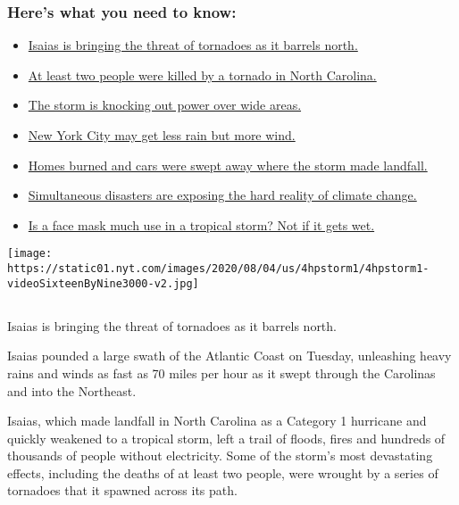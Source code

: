 \hypertarget{heres-what-you-need-to-know}{%
\subsubsection{Here's what you need to
know:}\label{heres-what-you-need-to-know}}

\begin{itemize}
\tightlist
\item
  \protect\hyperlink{link-362830dd}{Isaias is bringing the threat of
  tornadoes as it barrels north.}
\item
  \protect\hyperlink{link-7961bdbc}{At least two people were killed by a
  tornado in North Carolina.}
\item
  \protect\hyperlink{link-34e5d4e4}{The storm is knocking out power over
  wide areas.}
\item
  \protect\hyperlink{link-29c12cc}{New York City may get less rain but
  more wind.}
\item
  \protect\hyperlink{link-5066ef1c}{Homes burned and cars were swept
  away where the storm made landfall.}
\item
  \protect\hyperlink{link-665175e7}{Simultaneous disasters are exposing
  the hard reality of climate change.}
\item
  \protect\hyperlink{link-e77dd06}{Is a face mask much use in a tropical
  storm? Not if it gets wet.}
\end{itemize}

\texttt{[image: https://static01.nyt.com/images/2020/08/04/us/4hpstorm1/4hpstorm1-videoSixteenByNine3000-v2.jpg]}

\subsection{}

Isaias is bringing the threat of tornadoes as it barrels north.

Isaias pounded a large swath of the Atlantic Coast on Tuesday,
unleashing heavy rains and winds as fast as 70 miles per hour as it
swept through the Carolinas and into the Northeast.

Isaias, which made landfall in North Carolina as a Category 1 hurricane
and quickly weakened to a tropical storm, left a trail of floods, fires
and hundreds of thousands of people without electricity. Some of the
storm's most devastating effects, including the deaths of at least two
people, were wrought by a series of tornadoes that it spawned across its
path.

